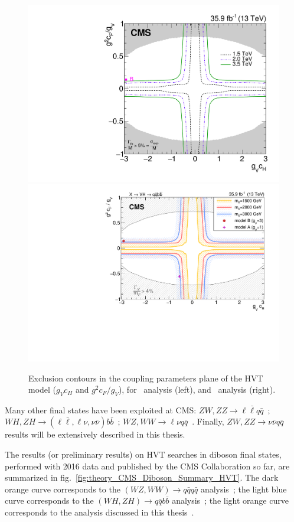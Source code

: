 \begin{figure}[!htb]
  \centering
    \includegraphics[height=.4\textwidth]{figures/B2G-17-001/CMS-B2G-17-001_Figure_007.pdf}%
    \includegraphics[height=.4\textwidth]{figures/B2G-17-002/CMS-B2G-17-002_Figure_007.pdf}
  \caption{Exclusion contours in the coupling parameters plane of the HVT model ($g_Vc_H$ and $g^2 c_F/g_V$), for~\cite{Sirunyan:2017acf,bib:CMS-PAS-B2G-17-001} analysis (left), and~\cite{CMS:2017eme,bib:CMS-PAS-B2G-17-002} analysis (right).}
  \label{fig:theory_exclusion_parameter_plane}
\end{figure}

\clearpage

\noindent Many other final states have been exploited at CMS: $ZW, ZZ \rightarrow \ell \bar{\ell} q\bar{q}$~\cite{CMS-PAS-B2G-16-022}; $WH, ZH \rightarrow (\ell \bar{\ell}, \ell \nu, \nu \bar{\nu}) b \bar{b}$~\cite{Khachatryan:2016cfx}; $WZ, WW \rightarrow \ell \nu q \bar{q}$~\cite{CMS-PAS-B2G-16-020}. Finally, $ZW, ZZ \rightarrow \nu \bar{\nu} q \bar{q}$~\cite{CMS-PAS-B2G-17-005} results will be extensively described in this thesis. 

\vspace*{1\baselineskip}

%
\noindent The results (or preliminary results) on HVT searches in diboson final states, performed with 2016 data and published by the CMS Collaboration so far, are summarized in fig.~\ref{fig:theory_CMS_Diboson_Summary_HVT}. The dark orange curve corresponds to the $(WZ, WW) \rightarrow q\bar{q}q\bar{q}$ analysis~\cite{Sirunyan:2017acf,bib:CMS-PAS-B2G-17-001}; the light blue curve corresponds to the $(WH, ZH) \rightarrow q\bar{q} b \bar{b}$ analysis~\cite{CMS:2017eme,bib:CMS-PAS-B2G-17-002}; the light orange curve corresponds to the analysis discussed in this thesis~\cite{CMS-PAS-B2G-17-005}.

